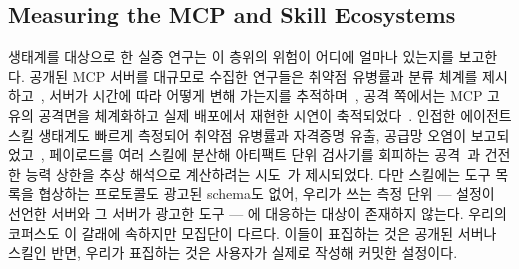 \documentclass[acmsmall,screen,review,anonymous]{acmart}
\begin{document}
\subsection{Measuring the MCP and Skill Ecosystems}
\label{sec:related:measurement}

생태계를 대상으로 한 실증 연구는 이 층위의 위험이 어디에 얼마나 있는지를 보고한다. 공개된 MCP 서버를 대규모로 수집한 연구들은 취약점 유병률과 분류 체계를 제시하고~\cite{majeed2026empirical, gaire2026systematization}, 서버가 시간에 따라 어떻게 변해 가는지를 추적하며~\cite{liu2026mcpevol}, 공격 쪽에서는 MCP 고유의 공격면을 체계화하고 실제 배포에서 재현한 시연이 축적되었다~\cite{sun2025msa, zhao2026parasites, liu2026sharelock, milanta2025github}. 인접한 에이전트 스킬 생태계도 빠르게 측정되어 취약점 유병률과 자격증명 유출, 공급망 오염이 보고되었고~\cite{liu2026agent, holzbauer2026context, chen2026your, qu2026supply, liu2026not, acharya2026skill}, 페이로드를 여러 스킬에 분산해 아티팩트 단위 검사기를 회피하는 공격~\cite{zeng2026colluskill}과 건전한 능력 상한을 추상 해석으로 계산하려는 시도~\cite{bhardwaj2026formal}가 제시되었다. 다만 스킬에는 도구 목록을 협상하는 프로토콜도 광고된 schema도 없어, 우리가 쓰는 측정 단위 --- 설정이 선언한 서버와 그 서버가 광고한 도구 --- 에 대응하는 대상이 존재하지 않는다. 우리의 코퍼스도 이 갈래에 속하지만 모집단이 다르다. 이들이 표집하는 것은 공개된 서버나 스킬인 반면, 우리가 표집하는 것은 사용자가 실제로 작성해 커밋한 설정이다.
\end{document}

